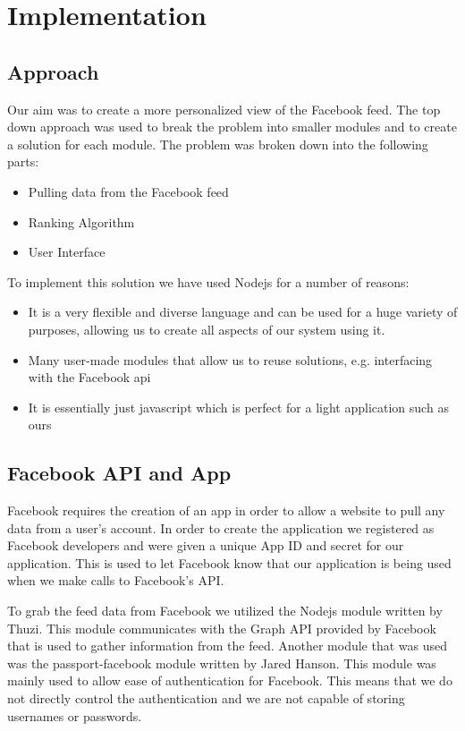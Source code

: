 
\chapter{Implementation}\label{ch:implementation}

\section{Approach}

Our aim was to create a more personalized view of the Facebook feed. The top down approach was used to break the problem into smaller modules and to create a solution for each module. The problem was broken down into the following parts:

\begin{itemize}
	\item Pulling data from the Facebook feed
	\item Ranking Algorithm
	\item User Interface
\end{itemize}

To implement this solution we have used Nodejs for a number of reasons: 

\begin{itemize}
	\item It is a very flexible and diverse language and can be used for a huge variety of purposes, allowing us to create all aspects of our system using it.
	\item Many user-made modules that allow us to reuse solutions, e.g. interfacing with the Facebook api
	\item It is essentially just javascript which is perfect for a light application such as ours
\end{itemize}

\newpage
\section{Facebook API and App}

Facebook requires the creation of an app in order to allow a website to pull any data from a user’s account. In order to create the application we registered as Facebook developers and were given a unique App ID and secret for our application. This is used to let Facebook know that our application is being used when we make calls to Facebook's API.

To grab the feed data from Facebook we utilized the Nodejs module written by Thuzi. This module communicates with the Graph API provided by Facebook that is used to gather information from the feed. Another module that was used was the passport-facebook module written by Jared Hanson. This module was mainly used to allow ease of authentication for Facebook. This means that we do not directly control the authentication and we are not capable of storing usernames or passwords.


